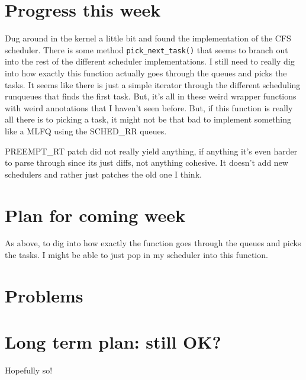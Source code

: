 \documentclass[12pt]{article}
\def\ind{\hspace*{0.3in}}
\begin{document}
\setlength{\parindent}{0in}
\addtolength{\parskip}{0.1cm}
\setlength{\fboxrule}{.5mm}\setlength{\fboxsep}{1.2mm}
\newlength{\boxlength}\setlength{\boxlength}{\textwidth}
\addtolength{\boxlength}{-4mm}
\begin{center}
\end{center}
\vspace{2mm}

\section*{Progress this week}
\ind Dug around in the kernel a little bit and found the implementation of the CFS scheduler. There is some method \texttt{pick\_next\_task()} that seems to branch out into the rest of the different scheduler implementations. I still need to really dig into how exactly this function actually goes through the queues and picks the tasks. It seems like there is just a simple iterator through the different scheduling runqueues that finds the first task. But, it's all in these weird wrapper functions with weird annotations that I haven't seen before. But, if this function is really all there is to picking a task, it might not be that bad to implement something like a MLFQ using the SCHED\_RR queues.

PREEMPT\_RT patch did not really yield anything, if anything it's even harder to parse through since its just diffs, not anything cohesive. It doesn't add new schedulers and rather just patches the old one I think.

\section*{Plan for coming week}
As above, to dig into how exactly the function goes through the queues and picks the tasks. I might be able to just pop in my scheduler into this function.

\section*{Problems}

\section*{Long term plan: still OK?}
Hopefully so! 
\end{document}
